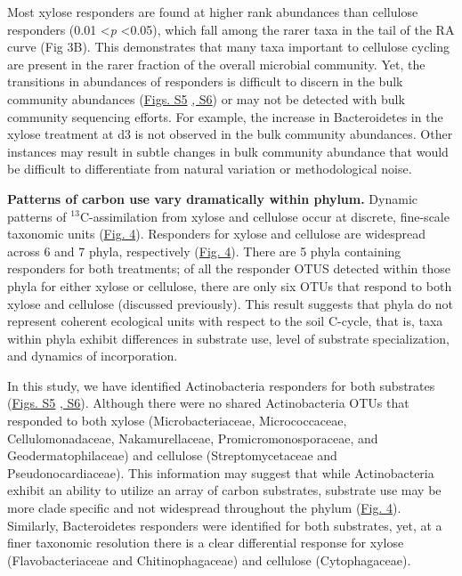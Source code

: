 Most xylose responders are found at higher rank abundances than cellulose
responders (0.01 \textless \textit{p} \textless 0.05), which fall among the
rarer taxa in the tail of the RA curve (Fig 3B). This demonstrates that many
taxa important to cellulose cycling are present in the rarer fraction of the
overall microbial community. Yet, the transitions in abundances of responders
is difficult to discern in the bulk community abundances
(\href{https://authorea.com/users/3537/articles/8459/master/file/figures/xylose_resp_profiles/xylose_resp_profiles.png}{Figs.
S5}
\href{https://authorea.com/users/3537/articles/8459/master/file/figures/cellulose_resp_profiles/cellulose_resp_profiles.png}{,
S6}) or may not be detected with bulk community sequencing efforts. For
example, the increase in Bacteroidetes in the xylose treatment at d3 is not
observed in the bulk community abundances. Other instances may result in subtle
changes in bulk community abundance that would be difficult to differentiate
from natural variation or methodological noise.


\textbf{Patterns of carbon use vary dramatically within phylum.} Dynamic
patterns of $^{13}$C-assimilation from xylose and cellulose occur
at discrete, fine-scale taxonomic units
(\href{https://authorea.com/users/3537/articles/3612/master/file/figures/bacteria_tree/bacteria_tree.png}{Fig.
4}). Responders for xylose and cellulose are widespread across 6 and 7 phyla,
respectively
(\href{https://authorea.com/users/3537/articles/3612/master/file/figures/bacteria_tree/bacteria_tree.png}{Fig.
4}). There are 5 phyla containing responders for both treatments; of all the
responder OTUS detected within those phyla for either xylose or cellulose,
there are only six OTUs that respond to both xylose and cellulose (discussed
previously). This result suggests that phyla do not represent coherent
ecological units with respect to the soil C-cycle, that is, taxa within phyla
exhibit differences in substrate use, level of substrate specialization, and
dynamics of incorporation. 

In this study, we have identified Actinobacteria responders for both substrates
(\href{https://authorea.com/users/3537/articles/8459/master/file/figures/xylose_resp_profiles/xylose_resp_profiles.png}{Figs.
S5}
\href{https://authorea.com/users/3537/articles/8459/master/file/figures/cellulose_resp_profiles/cellulose_resp_profiles.png}{,
S6}). Although there were no shared Actinobacteria OTUs that responded to both
xylose (Microbacteriaceae, Micrococcaceae, Cellulomonadaceae, Nakamurellaceae,
Promicromonosporaceae, and Geodermatophilaceae) and cellulose
(Streptomycetaceae and Pseudonocardiaceae). This information may suggest that
while Actinobacteria exhibit an ability to utilize an array of carbon
substrates, substrate use may be more clade specific and not widespread
throughout the phylum
(\href{https://authorea.com/users/3537/articles/3612/master/file/figures/bacteria_tree/bacteria_tree.png}{Fig.
4}). Similarly, Bacteroidetes responders were identified for both substrates,
yet, at a finer taxonomic resolution there is a clear differential response for
xylose (Flavobacteriaceae and Chitinophagaceae) and cellulose (Cytophagaceae). 


